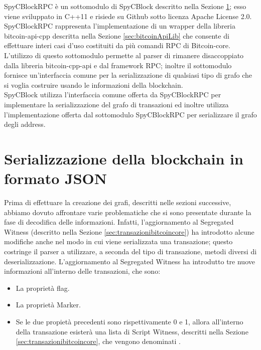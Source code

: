 SpyCBlockRPC è un sottomodulo di SpyCBlock descritto nella Sezione \ref{sec:spycblock}; esso viene sviluppato in C++11 e risiede su Github sotto licenza Apache License 2.0.\\
SpyCBlockRPC rappresenta l'implementazione di un wrapper della libreria bitcoin-api-cpp descritta nella Sezione \ref{sec:bitcoinApiLib} che consente di effettuare interi casi d'uso costituiti da più comandi RPC di Bitcoin-core.
L'utilizzo di questo sottomodulo permette al parser di rimanere disaccoppiato dalla libreria bitcoin-cpp-api e dal framework RPC; inoltre il sottomodulo fornisce un'interfaccia comune per la serializzazione di qualsiasi tipo di grafo che si voglia costruire usando le informazioni della blockchain.\\
SpyCBlock utilizza l'interfaccia comune offerta da SpyCBlockRPC per implementare la serializzazione del grafo di transazioni ed inoltre utilizza l'implementazione offerta dal sottomodulo SpyCBlockRPC per serializzare il grafo degli address.

\section{Serializzazione della blockchain in formato JSON} \label{sec:spycblock}

Prima di effettuare la creazione dei grafi, descritti nelle sezioni successive, abbiamo dovuto affrontare varie problematiche che si sono presentate durante la fase di decodifica delle informazioni. Infatti, l'aggiornamento al Segregated Witness (descritto nella Sezione \ref{sec:transazionibitcoincore}) ha introdotto alcune modifiche anche nel modo in cui viene serializzata una transazione; questo costringe il parser a utilizzare, a seconda del tipo di transazione, metodi diversi di deserializzazione.
L'aggiornamento al Segregated Witness ha introdutto tre nuove informazioni all'interno delle transazioni, che sono:
\begin{itemize}
  \item La proprietà flag.
  \item La proprietà Marker.
  \item Se le due propietà precedenti sono rispettivamente 0 e 1, allora all'interno della transazione esisterà una lista di Script Witness, descritti nella Sezione \ref{sec:transazionibitcoincore}, che vengono denominati .
\end{itemize}

